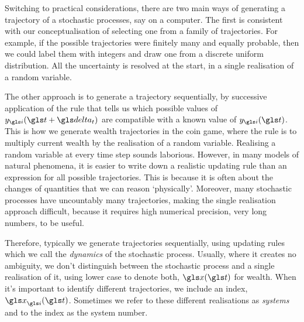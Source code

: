 Switching to practical considerations, there are two main ways of generating a trajectory of a stochastic processes, say on a computer. The first is consistent with our conceptualisation of selecting one from a family of trajectories. For example, if the possible trajectories were finitely many and equally probable, then we could label them with integers and draw one from a discrete uniform distribution. All the uncertainty is resolved at the start, in a single realisation of a random variable.

The other approach is to generate a trajectory sequentially, by successive application of the rule that tells us which possible values of $y_\gi(\t+\dt)$ are compatible with a known value of $y_\gi(\t)$. This is how we generate wealth trajectories in the coin game, where the rule is to multiply current wealth by the realisation of a random variable. Realising a random variable at every time step sounds laborious. However, in many models of natural phenomena, it is easier to write down a realistic updating rule than an expression for all possible trajectories. This is because it is often about the changes of quantities that we can reason `physically'. Moreover, many stochastic processes have uncountably many trajectories, making the single realisation approach difficult, because it requires high numerical precision, \ie very long numbers, to be useful.

Therefore, typically we generate trajectories sequentially, using updating rules which we call the \textit{dynamics} of the stochastic process. Usually, where it creates no ambiguity, we don't distinguish between the stochastic process and a single realisation of it, using lower case to denote both, \eg $\x(\t)$ for wealth. When it's important to identify different trajectories, we include an index, \eg $\x_\gi(\t)$. Sometimes we refer to these different realisations as \textit{systems} and to the index as the system number.

